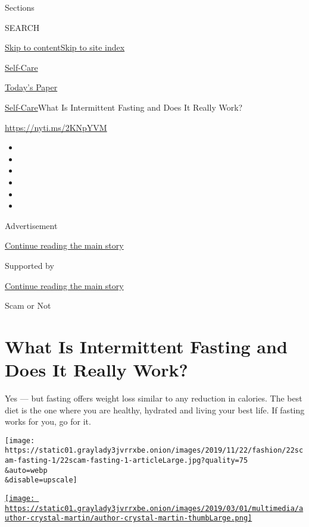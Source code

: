 Sections

SEARCH

\protect\hyperlink{site-content}{Skip to
content}\protect\hyperlink{site-index}{Skip to site index}

\href{https://www.nytimes3xbfgragh.onion/section/style/self-care/}{Self-Care}

\href{https://myaccount.nytimes3xbfgragh.onion/auth/login?response_type=cookie\&client_id=vi}{}

\href{https://www.nytimes3xbfgragh.onion/section/todayspaper}{Today's
Paper}

\href{/section/style/self-care/}{Self-Care}\textbar{}What Is
Intermittent Fasting and Does It Really Work?

\url{https://nyti.ms/2KNpYVM}

\begin{itemize}
\item
\item
\item
\item
\item
\item
\end{itemize}

Advertisement

\protect\hyperlink{after-top}{Continue reading the main story}

Supported by

\protect\hyperlink{after-sponsor}{Continue reading the main story}

Scam or Not

\hypertarget{what-is-intermittent-fasting-and-does-it-really-work}{%
\section{What Is Intermittent Fasting and Does It Really
Work?}\label{what-is-intermittent-fasting-and-does-it-really-work}}

Yes --- but fasting offers weight loss similar to any reduction in
calories. The best diet is the one where you are healthy, hydrated and
living your best life. If fasting works for you, go for it.

\texttt{[image: https://static01.graylady3jvrrxbe.onion/images/2019/11/22/fashion/22scam-fasting-1/22scam-fasting-1-articleLarge.jpg?quality=75\\\&auto=webp\\\&disable=upscale]}

\href{https://www.nytimes3xbfgragh.onion/by/crystal-martin}{\texttt{[image: https://static01.graylady3jvrrxbe.onion/images/2019/03/01/multimedia/author-crystal-martin/author-crystal-martin-thumbLarge.png]}}

